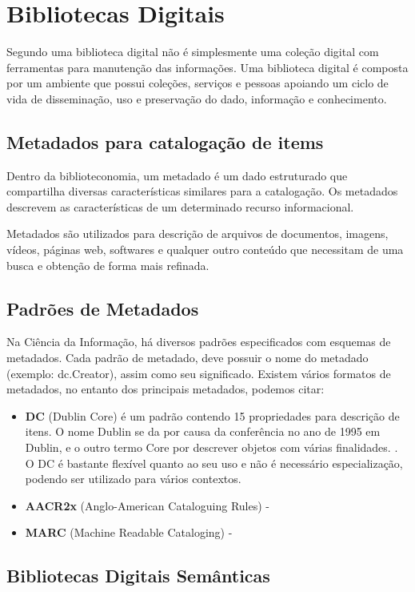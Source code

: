 \chapter{Bibliotecas Digitais}

Segundo uma biblioteca digital não é simplesmente uma coleção digital com ferramentas para manutenção das informações. Uma biblioteca digital é composta por um ambiente que possui coleções, serviços e pessoas apoiando um ciclo de vida de disseminação, uso e preservação do dado, informação e conhecimento.


\section{Metadados para catalogação de items}
Dentro da biblioteconomia, um metadado é um dado estruturado que compartilha diversas características similares para a catalogação. Os metadados descrevem as características de um determinado recurso informacional.

Metadados são utilizados para descrição de arquivos de documentos, imagens, vídeos, páginas web, softwares e qualquer outro conteúdo que necessitam de uma busca e obtenção de forma mais refinada. %


	
\section{Padrões de Metadados}
%
Na Ciência da Informação, há diversos padrões especificados com esquemas de metadados. Cada padrão de metadado, deve possuir o nome do metadado (exemplo: dc.Creator), assim como seu significado. Existem vários formatos de metadados, no entanto dos principais metadados, podemos citar:

\begin{itemize}
\item \textbf{DC} (Dublin Core) é um padrão contendo 15 propriedades para descrição de itens. O nome Dublin se da por causa da conferência no ano de 1995 em Dublin, e o outro termo Core por descrever objetos com várias finalidades. \cite{dbcore2012set}. O DC é bastante flexível quanto ao seu uso e não é necessário especialização, podendo ser utilizado para vários contextos.

\item \textbf{AACR2x} (Anglo-American Cataloguing Rules) - 
\item \textbf{MARC} (Machine Readable Cataloging) - 
\end{itemize}


\section{Bibliotecas Digitais Semânticas}


